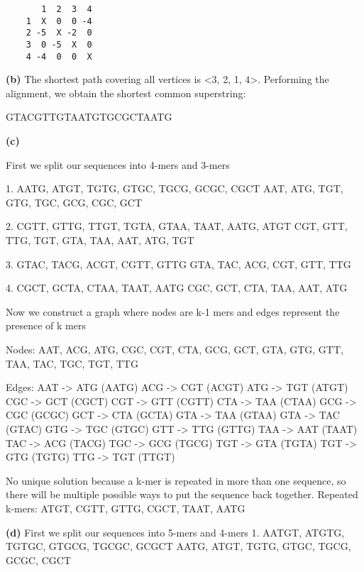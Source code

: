 \documentclass[11pt,letterpaper]{article}
\renewcommand{\part}[1] {\vspace{.10in} {\bf (#1)}}
\begin{document}
\begin{verbatim}
       1  2  3  4
    1  X  0  0 -4
    2 -5  X -2  0
    3  0 -5  X  0
    4 -4  0  0  X
\end{verbatim}

\part{b}
The shortest path covering all vertices is <3, 2, 1, 4>.
Performing the alignment, we obtain the shortest common superstring:

    GTACGTTGTAATGTGCGCTAATG

\part{c}

First we split our sequences into 4-mers and 3-mers

1.
AATG, ATGT, TGTG, GTGC, TGCG, GCGC, CGCT
AAT, ATG, TGT, GTG, TGC, GCG, CGC, GCT

2.
CGTT, GTTG, TTGT, TGTA, GTAA, TAAT, AATG, ATGT
CGT, GTT, TTG, TGT, GTA, TAA, AAT, ATG, TGT

3.
GTAC, TACG, ACGT, CGTT, GTTG
GTA, TAC, ACG, CGT, GTT, TTG

4.
CGCT, GCTA, CTAA, TAAT, AATG
CGC, GCT, CTA, TAA, AAT, ATG

Now we construct a graph where nodes are k-1 mers and edges represent the presence of k mers

Nodes:
AAT, ACG, ATG, CGC, CGT, CTA, GCG, GCT, GTA, GTG, GTT, TAA, TAC, TGC, TGT, TTG

Edges:
AAT -> ATG (AATG)
ACG -> CGT (ACGT)
ATG -> TGT (ATGT)
CGC -> GCT (CGCT)
CGT -> GTT (CGTT)
CTA -> TAA (CTAA)
GCG -> CGC (GCGC)
GCT -> CTA (GCTA)
GTA -> TAA (GTAA)
GTA -> TAC (GTAC)
GTG -> TGC (GTGC)
GTT -> TTG (GTTG)
TAA -> AAT (TAAT)
TAC -> ACG (TACG)
TGC -> GCG (TGCG)
TGT -> GTA (TGTA)
TGT -> GTG (TGTG)
TTG -> TGT (TTGT)


No unique solution because a k-mer is repeated in more than one sequence, so there will be multiple possible ways to put the sequence back together.
Repeated k-mers: ATGT, CGTT, GTTG, CGCT, TAAT, AATG

\part{d}
First we split our sequences into 5-mers and 4-mers
1.
AATGT, ATGTG, TGTGC, GTGCG, TGCGC, GCGCT
AATG, ATGT, TGTG, GTGC, TGCG, GCGC, CGCT
\end{document}
